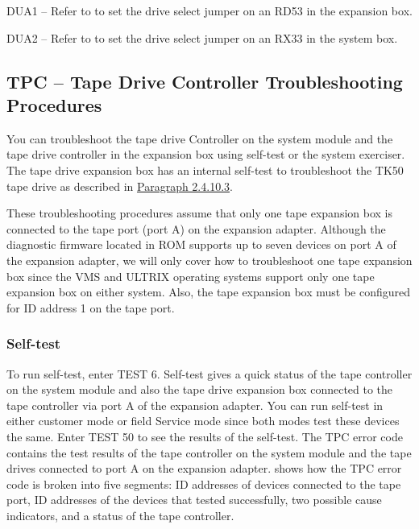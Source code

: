 DUA1 -- Refer to  to set the drive select jumper on an RD53 in
the expansion box.

DUA2 -- Refer to  to set the drive select jumper on an RX33 in
the system box.



\subsection{TPC -- Tape Drive Controller Troubleshooting Procedures}

You can troubleshoot the tape drive Controller on the system module and
the tape drive controller in the expansion box using self-test or the system
exerciser. The tape drive expansion box has an internal self-test to 
troubleshoot the TK50 tape drive as described in \hyperlink{subsubsection.2.4.10.3}{Paragraph 2.4.10.3}.

These troubleshooting procedures assume that only one tape expansion box
is connected to the tape port (port A) on the expansion adapter. Although
the diagnostic firmware located in ROM supports up to seven devices on
port A of the expansion adapter, we will only cover how to troubleshoot one
tape expansion box since the VMS and ULTRIX operating systems support
only one tape expansion box on either system. Also, the tape expansion
box must be configured for ID address 1 on the tape port.

\subsubsection{Self-test}

To run self-test, enter TEST 6. Self-test gives a quick status of the tape
controller on the system module and also the tape drive expansion box
connected to the tape controller via port A of the expansion adapter. You
can run self-test in either customer mode or field Service mode since both
modes test these devices the same. Enter TEST 50 to see the results of the
self-test. The TPC error code contains the test results of the tape controller
on the system module and the tape drives connected to port A on the
expansion adapter.  shows how the TPC error code is broken
into five segments: ID addresses of devices connected to the tape port,
ID addresses of the devices that tested successfully, two possible cause
indicators, and a status of the tape controller.

